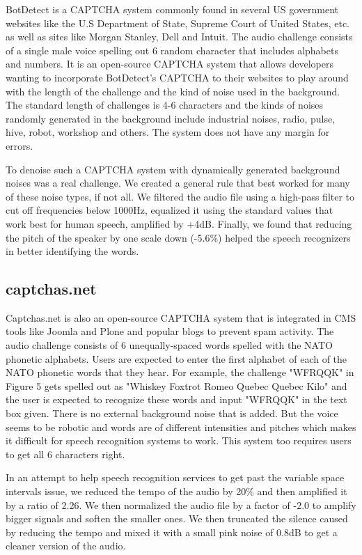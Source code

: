 BotDetect is a CAPTCHA system commonly found in several US government websites like the U.S Department of State, Supreme Court of United States, etc. as well as sites like Morgan Stanley, Dell and Intuit. The audio challenge consists of a single male voice spelling out 6 random character that includes alphabets and numbers. It is an open-source CAPTCHA system that allows developers wanting to incorporate BotDetect's CAPTCHA to their websites to play around with the length of the challenge and the kind of noise used in the background. The standard length of challenges is 4-6 characters and the kinds of noises randomly generated in the background include industrial noises, radio, pulse, hive, robot, workshop and others. The system does not have any margin for errors.\newline

To denoise such a CAPTCHA system with dynamically generated background noises was a real challenge. We created a general rule that best worked for many of these noise types, if not all. We filtered the audio file using a high-pass filter to cut off frequencies below 1000Hz, equalized it using the standard values that work best for human speech, amplified by +4dB. Finally, we found that reducing the pitch of the speaker by one scale down (-5.6\%) helped the speech recognizers in better identifying the words.

\subsection{captchas.net}
\label{sec:captchasnet}
Captchas.net is also an open-source CAPTCHA system that is integrated in CMS tools like Joomla and Plone and popular blogs to prevent spam activity. The audio challenge consists of 6 unequally-spaced words spelled with the NATO phonetic alphabets. Users are expected to enter the first alphabet of each of the NATO phonetic words that they hear. For example, the challenge "WFRQQK" in Figure 5 gets spelled out as "Whiskey Foxtrot Romeo Quebec Quebec Kilo" and the user is expected to recognize these words and input "WFRQQK" in the text box given. There is no external background noise that is added. But the voice seems to be robotic and words are of different intensities and pitches which makes it difficult for speech recognition systems to work. This system too requires users to get all 6 characters right.\newline

In an attempt to help speech recognition services to get past the variable space intervals issue, we reduced the tempo of the audio by 20\% and then amplified it by a ratio of 2.26. We then normalized the audio file by a factor of -2.0 to amplify bigger signals and soften the smaller ones. We then truncated the silence caused by reducing the tempo and mixed it with a small pink noise of 0.8dB to get a cleaner version of the audio.\newline

